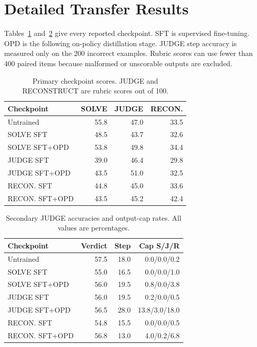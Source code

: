 \documentclass[11pt]{article}
\begin{document}


\clearpage
\appendix

\section{Detailed Transfer Results}
\label{app:transfer}

Tables~\ref{tab:transfer-full} and~\ref{tab:transfer-secondary} give every reported checkpoint. SFT is supervised fine-tuning. OPD is the following on-policy distillation stage. JUDGE step accuracy is measured only on the 200 incorrect examples. Rubric scores can use fewer than 400 paired items because malformed or unscorable outputs are excluded.

\begin{table}[h]
\centering
\footnotesize
\setlength{\tabcolsep}{3pt}
\begin{tabular}{lrrr}
\toprule
Checkpoint & SOLVE & JUDGE & RECON. \\
\midrule
Untrained & 55.8 & 47.0 & 33.5 \\
SOLVE SFT & 48.5 & 43.7 & 32.6 \\
SOLVE SFT+OPD & 53.8 & 49.8 & 34.4 \\
JUDGE SFT & 39.0 & 46.4 & 29.8 \\
JUDGE SFT+OPD & 43.5 & 51.0 & 32.5 \\
RECON. SFT & 44.8 & 45.0 & 33.6 \\
RECON. SFT+OPD & 43.5 & 45.2 & 42.4 \\
\bottomrule
\end{tabular}
\caption{Primary checkpoint scores. JUDGE and RECONSTRUCT are rubric scores out of 100.}
\label{tab:transfer-full}
\end{table}

\begin{table}[h]
\centering
\footnotesize
\setlength{\tabcolsep}{2.7pt}
\begin{tabular}{lrrr}
\toprule
Checkpoint & Verdict & Step & Cap S/J/R \\
\midrule
Untrained & 57.5 & 18.0 & 0.0/0.0/0.2 \\
SOLVE SFT & 55.0 & 16.5 & 0.0/0.0/1.0 \\
SOLVE SFT+OPD & 56.0 & 19.5 & 0.8/0.0/3.8 \\
JUDGE SFT & 56.0 & 19.5 & 0.2/0.0/0.5 \\
JUDGE SFT+OPD & 56.5 & 28.0 & 13.8/3.0/18.0 \\
RECON. SFT & 54.8 & 15.5 & 0.0/0.0/0.5 \\
RECON. SFT+OPD & 56.8 & 13.0 & 4.0/0.2/6.8 \\
\bottomrule
\end{tabular}
\caption{Secondary JUDGE accuracies and output-cap rates. All values are percentages.}
\label{tab:transfer-secondary}
\end{table}
\end{document}
